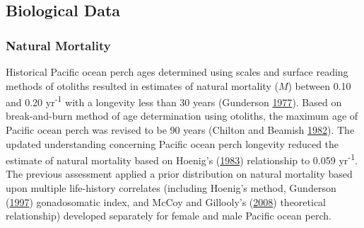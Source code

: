 \documentclass[12pt,]{article}
\begin{document}
\subsection{Biological Data}\label{biological-data}

\subsubsection{Natural Mortality}\label{natural-mortality}

Historical Pacific ocean perch ages determined using scales and surface
reading methods of otoliths resulted in estimates of natural mortality
(\(M\)) between 0.10 and 0.20 yr\textsuperscript{-1} with a longevity
less than 30 years (Gunderson
\protect\hyperlink{ref-gunderson_population_1977}{1977}). Based on
break-and-burn method of age determination using otoliths, the maximum
age of Pacific ocean perch was revised to be 90 years (Chilton and
Beamish \protect\hyperlink{ref-chilton_age_1982}{1982}). The updated
understanding concerning Pacific ocean perch longevity reduced the
estimate of natural mortality based on Hoenig's
(\protect\hyperlink{ref-hoenig_empirical_1983}{1983}) relationship to
0.059 yr\textsuperscript{-1}. The previous assessment applied a prior
distribution on natural mortality based upon multiple life-history
correlates (including Hoenig's method, Gunderson
(\protect\hyperlink{ref-gunderson_trade-off_1997}{1997}) gonadosomatic
index, and McCoy and Gillooly's
(\protect\hyperlink{ref-mccoy_predicting_2008}{2008}) theoretical
relationship) developed separately for female and male Pacific ocean
perch.
\end{document}
